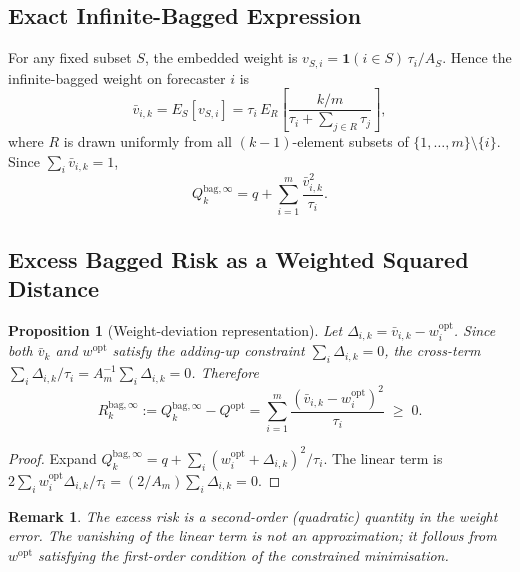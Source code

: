\documentclass[12pt,a4paper]{article}
\newtheorem{proposition}{Proposition}
\newtheorem{remark}{Remark}
\theoremstyle{definition}
\begin{document}
\subsection{Exact Infinite-Bagged Expression}

For any fixed subset $S$, the embedded weight is $v_{S,i}=\mathbf{1}(i\in S)\,\tau_i/A_S$.
Hence the infinite-bagged weight on forecaster $i$ is
\begin{equation}\label{eq:vbar_exact}
\bar v_{i,k} = E_S[v_{S,i}] = \tau_i\,E_R\!\left[\frac{k/m}{\tau_i+\sum_{j\in R}\tau_j}\right],
\end{equation}
where $R$ is drawn uniformly from all $(k-1)$-element subsets of
$\{1,\ldots,m\}\setminus\{i\}$. Since $\sum_i\bar v_{i,k}=1$,
\begin{equation}\label{eq:Qbag_exact}
Q_k^{\mathrm{bag},\infty} = q + \sum_{i=1}^m\frac{\bar v_{i,k}^2}{\tau_i}.
\end{equation}

\subsection{Excess Bagged Risk as a Weighted Squared Distance}

\begin{proposition}[Weight-deviation representation]\label{prop:wdev}
Let $\Delta_{i,k}=\bar v_{i,k}-w_i^{\mathrm{opt}}$.
Since both $\bar v_k$ and $w^{\mathrm{opt}}$ satisfy the adding-up constraint
$\sum_i\Delta_{i,k}=0$, the cross-term $\sum_i\Delta_{i,k}/\tau_i
= A_m^{-1}\sum_i\Delta_{i,k}=0$. Therefore
\begin{equation}\label{eq:Rbag_exact}
R_k^{\mathrm{bag},\infty} := Q_k^{\mathrm{bag},\infty} - Q^{\mathrm{opt}}
= \sum_{i=1}^m \frac{(\bar v_{i,k}-w_i^{\mathrm{opt}})^2}{\tau_i} \;\geq\; 0.
\end{equation}
\end{proposition}

\begin{proof}
Expand $Q_k^{\mathrm{bag},\infty}=q+\sum_i(w_i^{\mathrm{opt}}+\Delta_{i,k})^2/\tau_i$.
The linear term is $2\sum_i w_i^{\mathrm{opt}}\Delta_{i,k}/\tau_i
= (2/A_m)\sum_i\Delta_{i,k}=0$.
\end{proof}

\begin{remark}
The excess risk is a second-order (quadratic) quantity in the weight error.
The vanishing of the linear term is not an approximation; it follows from
$w^{\mathrm{opt}}$ satisfying the first-order condition of the constrained
minimisation.
\end{remark}
\end{document}
